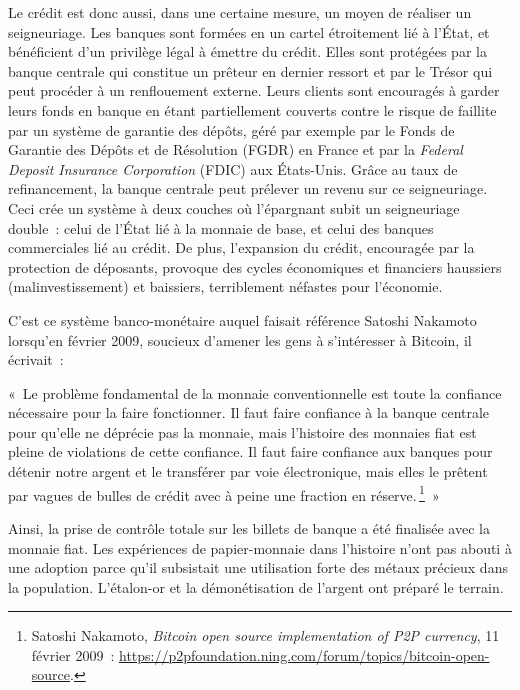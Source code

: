 \documentclass[a4paper,notitlepage]{article}
\renewenvironment{quote}{\small\list{}{\topsep=0.5\baselineskip}\item\relax}{\endlist} %
\newcommand{\eng}[1]{{\NoAutoSpaceBeforeFDP\emph{#1}}}  %
\newcommand{\sfootnote}{\,\footnote}
\begin{document}
Le crédit est donc aussi, dans une certaine mesure, un moyen de réaliser un seigneuriage. Les banques sont formées en un cartel étroitement lié à l'État, et bénéficient d'un privilège légal à émettre du crédit. Elles sont protégées par la banque centrale qui constitue un prêteur en dernier ressort et par le Trésor qui peut procéder à un renflouement externe. Leurs clients sont encouragés à garder leurs fonds en banque en étant partiellement couverts contre le risque de faillite par un système de garantie des dépôts, géré par exemple par le Fonds de Garantie des Dépôts et de Résolution (FGDR) en France et par la \eng{Federal Deposit Insurance Corporation} (FDIC) aux États-Unis. Grâce au taux de refinancement, la banque centrale peut prélever un revenu sur ce seigneuriage. Ceci crée un système à deux couches où l'épargnant subit un seigneuriage double~: celui de l'État lié à la monnaie de base, et celui des banques commerciales lié au crédit. De plus, l'expansion du crédit, encouragée par la protection de déposants, provoque des cycles économiques et financiers haussiers (malinvestissement) et baissiers, terriblement néfastes pour l'économie.

C'est ce système banco-monétaire auquel faisait référence Satoshi Nakamoto lorsqu'en février 2009, soucieux d'amener les gens à s'intéresser à Bitcoin, il écrivait~:

\begin{quote}
«~Le problème fondamental de la monnaie conventionnelle est toute la confiance nécessaire pour la faire fonctionner. Il faut faire confiance à la banque centrale pour qu'elle ne déprécie pas la monnaie, mais l'histoire des monnaies fiat est pleine de violations de cette confiance. Il faut faire confiance aux banques pour détenir notre argent et le transférer par voie électronique, mais elles le prêtent par vagues de bulles de crédit avec à peine une fraction en réserve.\sfootnote{Satoshi Nakamoto, \eng{Bitcoin open source implementation of P2P currency}, 11 février 2009~: \url{https://p2pfoundation.ning.com/forum/topics/bitcoin-open-source}.}~»
\end{quote}



Ainsi, la prise de contrôle totale sur les billets de banque a été finalisée avec la monnaie fiat. Les expériences de papier-monnaie dans l'histoire n'ont pas abouti à une adoption parce qu'il subsistait une utilisation forte des métaux précieux dans la population. L'étalon-or et la démonétisation de l'argent ont préparé le terrain.
\end{document}
